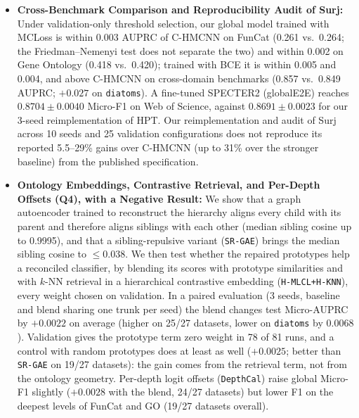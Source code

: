 \documentclass[preprint,12pt]{elsarticle}
\begin{document}
\begin{itemize}[leftmargin=*,nosep]
    reconciliation gain: its correlation with the fraction of positive
    labels on internal nodes is null (Spearman $\rho = -0.07$, $p = 0.721$).
    The gain does track how far bottom-up propagation raises internal-node
    scores ($\rho = 0.49$, $p = 0.009$), but that quantity is observed only
    after the classifier has been trained, so it describes the mechanism
    rather than predicting it from the hierarchy.
  \item \textbf{Cross-Benchmark Comparison and Reproducibility Audit of
    Surj:} Under validation-only threshold selection, our global model
    trained with MCLoss is within 0.003 AUPRC of C-HMCNN on FunCat (0.261
    vs.\ 0.264; the Friedman--Nemenyi test does not separate the two) and
    within 0.002 on Gene Ontology (0.418 vs.\ 0.420); trained with BCE it is
    within 0.005 and 0.004, and above C-HMCNN on cross-domain benchmarks
    (0.857 vs.\ 0.849 AUPRC; $+0.027$ on \texttt{diatoms}). A fine-tuned
    SPECTER2 (globalE2E) reaches $0.8704 \pm 0.0040$ Micro-F1 on Web of
    Science, against $0.8691 \pm 0.0023$ for our 3-seed reimplementation of HPT.
    Our reimplementation and audit of Surj~\cite{www2022ontology} across 10
    seeds and 25 validation configurations does not reproduce its reported
    5.5--29\% gains over C-HMCNN (up to 31\% over the stronger baseline) from
    the published specification.
  \item \textbf{Ontology Embeddings, Contrastive Retrieval, and Per-Depth
    Offsets (Q4), with a Negative Result:} We show that a graph autoencoder
    trained to reconstruct the hierarchy aligns every child with its parent
    and therefore aligns siblings with each other (median sibling cosine up
    to 0.9995), and that a sibling-repulsive variant (\texttt{SR-GAE})
    brings the median sibling cosine to $\le 0.038$. We then test whether
    the repaired prototypes help a reconciled classifier, by blending its
    scores with prototype similarities and with $k$-NN retrieval in a
    hierarchical contrastive embedding (\texttt{H-MLCL+H-KNN}), every weight
    chosen on validation. In a paired evaluation (3 seeds, baseline and
    blend sharing one trunk per seed) the blend changes test Micro-AUPRC by
    $+0.0022$ on average (higher on 25/27 datasets, lower on
    \texttt{diatoms} by $0.0068$). Validation gives the prototype term zero
    weight in 78 of 81 runs, and a control with random prototypes does at
    least as well ($+0.0025$; better than \texttt{SR-GAE} on 19/27
    datasets): the gain comes from the retrieval term, not from the
    ontology geometry. Per-depth logit offsets (\texttt{DepthCal}) raise
    global Micro-F1 slightly ($+0.0028$ with the blend, 24/27 datasets) but
    lower F1 on the deepest levels of FunCat and GO (19/27 datasets
    overall).
\end{itemize}
\end{document}
